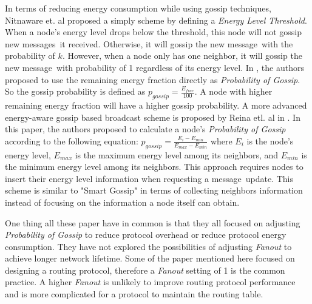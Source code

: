 \documentclass[onehalf,11pt]{beavtex}
\newcommand{\pog}{Probability of Gossip}
\newcommand{\msgs}{messages}
\newcommand{\msg}{message}
\begin{document}
In terms of reducing energy consumption while using gossip techniques, Nitnaware et. al \cite{nitnaware2009performance} proposed a simply scheme by defining a \emph{Energy Level Threshold}. When a node's energy level drops below the threshold, this node will not gossip new \msgs ~it received. Otherwise, it will gossip the new \msg ~with the probability of $k$. However, when a node only has one neighbor, it will gossip the new \msg ~with probability of 1 regardless of its energy level. In \cite{nitnaware2010energy}, the authors proposed to use the remaining energy fraction directly as \emph{\pog}. So the gossip probability is defined as $p_{gossip}=\frac{E_{frac}}{100}$. A node with higher remaining energy fraction will have a higher gossip probability. A more advanced energy-aware gossip based broadcast scheme is proposed by Reina etl. al in \cite{reina2012optimization}. In this paper, the authors proposed to calculate a node's \emph{\pog} according to the following equation: $p_{gossip}=\frac{E_i - E_{min}}{E_{max}-E_{min}}$ where $E_i$ is the node's energy level, $E_{max}$ is the maximum energy level among its neighbors, and $E_{min}$ is the minimum energy level among its neighbors. This approach requires nodes to insert their energy level information when requesting a \msg ~update. This scheme is similar to "Smart Gossip" in terms of collecting neighbors information instead of focusing on the information a node itself can obtain. 


One thing all these paper have in common is that they all focused on adjusting \emph{\pog} to reduce protocol overhead or reduce protocol energy consumption. They have not explored the possibilities of adjusting \emph{Fanout} to achieve longer network lifetime. Some of the paper mentioned here focused on designing a routing protocol, therefore a \emph{Fanout} setting of 1 is the common practice. A higher \emph{Fanout} is unlikely to improve routing protocol performance and is more complicated for a protocol to maintain the routing table. 

\end{document}
